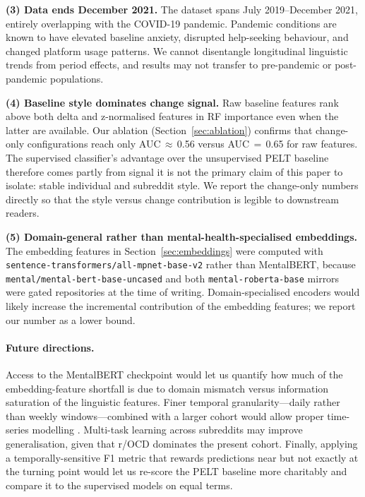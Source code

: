 \documentclass[11pt]{article}
\begin{document}
\textbf{(3) Data ends December 2021.}
The dataset spans July 2019--December 2021, entirely overlapping with the
COVID-19 pandemic.
Pandemic conditions are known to have elevated baseline anxiety, disrupted
help-seeking behaviour, and changed platform usage patterns.
We cannot disentangle longitudinal linguistic trends from period effects,
and results may not transfer to pre-pandemic or post-pandemic populations.

\textbf{(4) Baseline style dominates change signal.}
Raw baseline features rank above both delta and z-normalised features
in RF importance even when the latter are available.
Our ablation (Section~\ref{sec:ablation}) confirms that change-only
configurations reach only AUC\,$\approx$\,0.56 versus AUC\,$=$\,0.65 for
raw features.
The supervised classifier's advantage over the unsupervised PELT
baseline therefore comes partly from signal it is not the primary
claim of this paper to isolate: stable individual and subreddit style.
We report the change-only numbers directly so that the style versus
change contribution is legible to downstream readers.

\textbf{(5) Domain-general rather than mental-health-specialised
embeddings.}
The embedding features in Section~\ref{sec:embeddings} were computed
with \texttt{sentence-transformers/all-mpnet-base-v2} rather than
MentalBERT, because
\texttt{mental/mental-bert-base-uncased} and both
\texttt{mental-roberta-base} mirrors were gated repositories at the
time of writing.
Domain-specialised encoders would likely increase the incremental
contribution of the embedding features; we report our number as a
lower bound.

\paragraph{Future directions.}
Access to the MentalBERT checkpoint would let us quantify how much of
the embedding-feature shortfall is due to domain mismatch versus
information saturation of the linguistic features.
Finer temporal granularity---daily rather than weekly windows---combined
with a larger cohort would allow proper time-series modelling
\citep{yates2017depression}.
Multi-task learning across subreddits may improve generalisation,
given that r/OCD dominates the present cohort.
Finally, applying a temporally-sensitive F1 metric
\citep{tsakalidis2022identifying} that rewards predictions near but
not exactly at the turning point would let us re-score the PELT
baseline more charitably and compare it to the supervised models on
equal terms.
\end{document}
